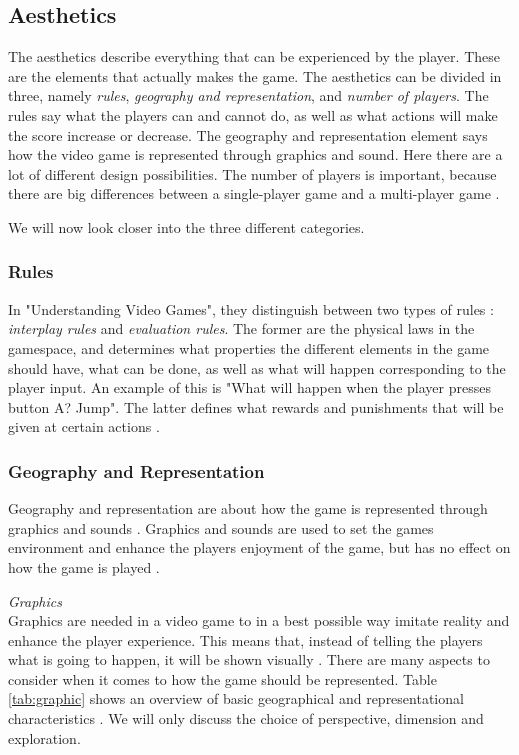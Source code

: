 \subsection{Aesthetics}
The aesthetics describe everything that can be experienced by the player. These are the elements that actually makes the game. The aesthetics can be divided in three, namely \emph{rules}, \emph{geography and representation}, and \emph{number of players}. The rules say what the players can and cannot do, as well as what actions will make the score increase or decrease. The geography and representation element says how the video game is represented through graphics and sound. Here there are a lot of different design possibilities. The number of players is important, because there are big differences between a single-player game and a multi-player game \cite{understandingvg}.

We will now look closer into the three different categories.

\subsubsection{Rules}
In "Understanding Video Games", they distinguish between two types of rules  \cite{understandingvg}: \emph{interplay rules} and \emph{evaluation rules}. The former are the physical laws in the gamespace, and determines what properties the different elements in the game should have, what can be done, as well as what will happen corresponding to the player input. An example of this is "What will happen when the player presses button A? Jump". The latter defines what rewards and punishments that will be given at certain actions \cite{understandingvg}. 

\subsubsection{Geography and Representation}
\label{sec:georep}
Geography and representation are about how the game is represented through graphics and sounds \cite{understandingvg}. Graphics and sounds are used to set the games environment and enhance the players enjoyment of the game, but has no effect on how the game is played \cite{umlapproach}.  

\emph{Graphics}\\
Graphics are needed in a video game to in a best possible way imitate reality and enhance the player experience. This means that, instead of telling the players what is going to happen, it will be shown visually \cite{umlapproach}.
There are many aspects to consider when it comes to how the game should be represented. Table \ref{tab:graphic} shows an overview of basic geographical and representational characteristics \cite{understandingvg}. We will only discuss the choice of perspective, dimension and exploration. 

